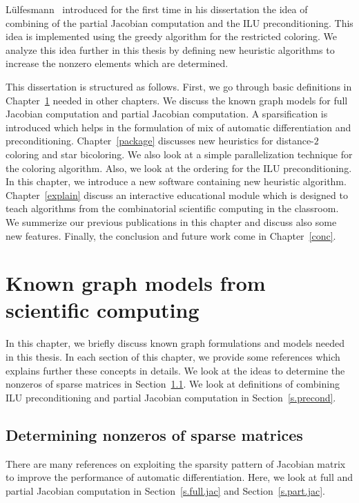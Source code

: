 \documentclass[12pt, twoside,a4paper,toc=bibliography]{scrbook}
\newcommand{\secref}[1]{Section~\protect\ref{#1}}
\newcommand{\chapref}[1]{Chapter~\protect\ref{#1}}
\begin{document}
Lülfesmann~\cite{Lulfesmann2012Fap} introduced for the first time in his dissertation
the idea of combining of the partial Jacobian computation and the ILU preconditioning. 
This idea is implemented using the greedy algorithm for the restricted coloring. 
We analyze this idea further in this thesis by defining new heuristic algorithms
to increase the nonzero elements which are determined.

This dissertation is structured as follows.
First, we go through basic definitions in \chapref{prel} needed in other chapters.
We discuss the known graph models for full Jacobian computation and partial Jacobian
computation. A sparsification is introduced which helps in the formulation of
mix of automatic differentiation and preconditioning.
\chapref{package} discusses new heuristics for distance-$2$ coloring and
star bicoloring. We also look at a simple parallelization technique for the
coloring algorithm. Also, we look at the ordering for the ILU preconditioning.
In this chapter, we introduce a new software
containing new heuristic algorithm.
\chapref{explain} discuss an interactive educational module
which is designed to teach algorithms from the combinatorial scientific computing in the classroom.
We summerize our previous publications
\cite{2013:05,2014:01,2014:02,2014:09,2015:3} in this chapter and discuss also 
some new features.
Finally, the conclusion and future work come in \chapref{conc}.

\chapter{Known graph models from scientific computing}
\label{prel}
In this chapter, we briefly discuss known graph formulations and
models needed in this thesis. In each section of this chapter,
we provide some references which explains further these concepts in details.
We look at the ideas to determine the nonzeros of sparse matrices in
\secref{s.det.nonzero}.
We look at definitions of combining ILU preconditioning and 
partial Jacobian computation in \secref{s.precond}.

\section{Determining nonzeros of sparse matrices}
\label{s.det.nonzero}
There are many references on exploiting the sparsity pattern of Jacobian matrix
to improve the performance of automatic differentiation.
Here, we look at full and partial Jacobian computation in
\secref{s.full.jac} and \secref{s.part.jac}.
\end{document}
